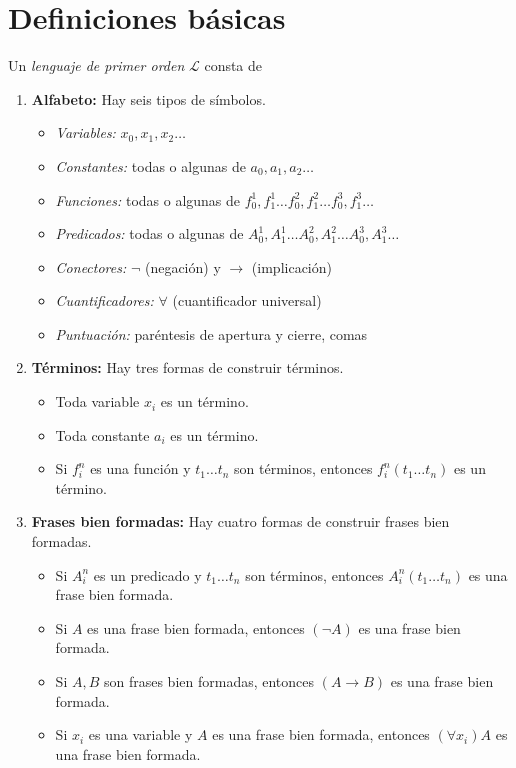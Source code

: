 \chapter{Definiciones básicas}

\begin{definition}
Un \textit{lenguaje de primer orden} $\mathscr L$ consta de

\begin{enumerate}
    \item \textbf{Alfabeto:} Hay seis tipos de símbolos.
    \begin{itemize}
        \item \textit{Variables:} $x_0, x_1, x_2 \dots$
        \item \textit{Constantes:} todas o algunas de $a_0, a_1, a_2 \dots$
        \item \textit{Funciones:} todas o algunas de $f_0^1, f_1^1 \dots f_0^2, f_1^2 \dots f_0^3, f_1^3 \dots$
        \item \textit{Predicados:} todas o algunas de $A_0^1, A_1^1 \dots A_0^2, A_1^2 \dots A_0^3, A_1^3 \dots$
        \item \textit{Conectores:} $\neg$ (negación) y $\to$ (implicación)
        \item \textit{Cuantificadores:} $\forall$ (cuantificador universal)
        \item \textit{Puntuación:} paréntesis de apertura y cierre, comas
    \end{itemize}
    
    \item \textbf{Términos:} Hay tres formas de construir términos.
    \begin{itemize}
        \item Toda variable $x_i$ es un término.
        \item Toda constante $a_i$ es un término.
        \item Si $f_i^n$ es una función y $t_1 \dots t_n$ son términos, entonces $f_i^n(t_1 \dots t_n)$ es un término.
    \end{itemize}
    
    \item \textbf{Frases bien formadas:} Hay cuatro formas de construir frases bien formadas.
    \begin{itemize}
        \item Si $A_i^n$ es un predicado y $t_1 \dots t_n$ son términos, entonces $A_i^n(t_1 \dots t_n)$ es una frase bien formada.
        \item Si $A$ es una frase bien formada, entonces $(\neg A)$ es una frase bien formada.
        \item Si $A,B$ son frases bien formadas, entonces $(A \to B)$ es una frase bien formada.
        \item Si $x_i$ es una variable y $A$ es una frase bien formada, entonces $(\forall x_i) A$ es una frase bien formada.
    \end{itemize}
    

\end{enumerate}
\end{definition}
